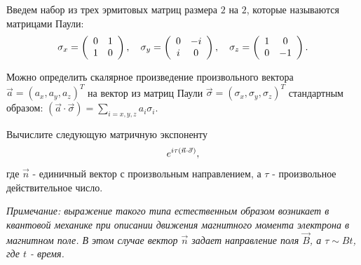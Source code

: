 \documentclass[a4paper,12pt]{article}
\begin{document}
\noindent Введем набор из трех эрмитовых матриц размера $2$ на $2$, которые называются матрицами Паули:
\begin{equation}\notag
\sigma_{x}=\left(\begin{array}{cc}
0 & 1\\
1 & 0
\end{array}\right),\quad\sigma_{y}=\left(\begin{array}{cc}
0 & -i\\
i & 0
\end{array}\right),\quad\sigma_{z}=\left(\begin{array}{cc}
1 & 0\\
0 & -1
\end{array}\right).
\end{equation}

\noindent Можно определить скалярное произведение произвольного вектора $\vec{a}=(a_{x},a_{y},a_{z})^{T}$ на вектор из матриц Паули $\vec{\sigma}=(\sigma_{x},\sigma_{y},\sigma_{z})^{T}$ стандартным образом: $\left(\vec{a}\cdot\vec{\sigma}\right)=\sum_{i=x,y,z}a_{i}\sigma_{i}$.

\noindent Вычислите следующую матричную экспоненту
\begin{equation}\notag
e^{i\tau\left(\vec{n}\cdot\vec{\sigma}\right)},
\end{equation}
\noindent где $\vec{n}$ - единичный вектор с произвольным направлением, а $\tau$ - произвольное действительное число.

\noindent \textit{Примечание: выражение такого типа естественным образом возникает в квантовой механике при описании движения магнитного момента электрона в магнитном поле. В этом случае вектор $\vec{n}$ задает направление поля $\vec{B}$, а $\tau\sim Bt$, где $t$ - время.}
\end{document}
